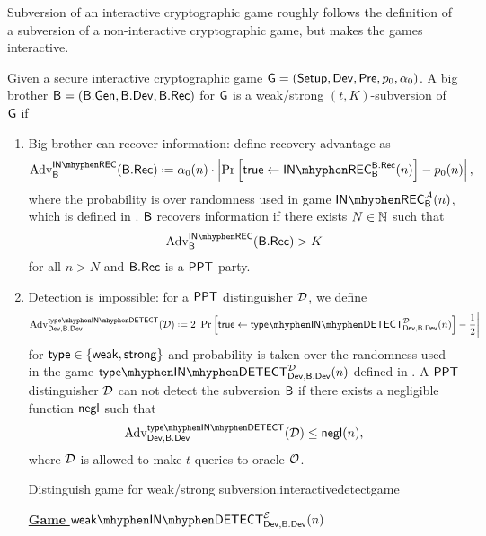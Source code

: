 Subversion of an interactive cryptographic game roughly follows the definition of a subversion of a non-interactive cryptographic game, but makes the games interactive.  

\begin{defn}
	Given a secure interactive cryptographic game $\operatorname{\mathsf{G}}=\left(\operatorname{\mathsf{Setup}},\operatorname{\mathsf{Dev}},\operatorname{\mathsf{Pre}},p_{0},\alpha_{0}\right)$. A big brother $\mathsf{B} = \left(\mathsf{B}.\mathsf{Gen},\mathsf{B}.\mathsf{Dev},\mathsf{B}.\mathsf{Rec}\right)$ for $\operatorname{\mathsf{G}}$ is a weak/strong $(t,K)$-subversion of $\operatorname{\mathsf{G}}$ if 
	\begin{enumerate}[1.]

		\item Big brother can recover information: define recovery advantage as
		\begin{align*} 
			\adv_{\bb}^{\inrecgame}(\bbrec)\defeq \secf(n)\cdot \left\vert \prob{\true\leftarrow \inrecgame_{\bb}^{\bbrec}(n)} - \basep(n)\right\vert,
		\end{align*}
		where the probability is over randomness used in game $\inrecgame_{\bb}^{\adve}(n)$, which is defined in . $\mathsf{B}$ recovers information if there exists $N\in\mathbb{N}$ such that
		\begin{align*}
			\adv_{\bb}^{\inrecgame}(\bbrec)>K
		\end{align*}
		for all $n>N$ and $\mathsf{B}.\mathsf{Rec}$ is a $\mathsf{PPT}$ party. 
		\item  Detection is impossible: for a $\mathsf{PPT}$ distinguisher $\operatorname{\mathcal{D}}$, we define 
		\begin{align*}
		\adv_{\dev,\bbdev}^{\innotationtypedetect}(\dist) \defeq 2\left\vert \prob{\true\leftarrow \intypedetect{\dev}{\bbdev}{\dist}}-\frac{1}{2}\right\vert 
		\end{align*}
		for $\mathsf{type}\in\{\mathsf{weak},\mathsf{strong}\}$ and probability is taken over the randomness used in the game $\intypedetect{\dev}{\bbdev}{\dist}$ defined in . A $\mathsf{PPT}$ distinguisher $\operatorname{\mathcal{D}}$ can not detect the subversion $\mathsf{B}$ if there exists a negligible function $\operatorname{\mathsf{negl}}$ such that
		\begin{align*}
			\adv_{\dev,\bbdev}^{\innotationtypedetect}(\dist)\leq \negl(n),
		\end{align*}
		where $\operatorname{\mathcal{D}}$ is allowed to make $t$ queries to oracle $\operatorname{\mathcal{O}}$.
		\begin{boxfigTwo}{Distinguish game for weak/strong subversion.}{interactivedetectgame}
\begin{minipage}{0.45\textwidth}
    \smallskip
	\begin{description}
 	\item[\underline{\textbf{Game} $\inweakdetect{\dev}{\bbdev}{\eve}$}] ~
 	

\end{description}
\end{minipage}
\end{boxfigTwo}
\end{enumerate}
\end{defn}
